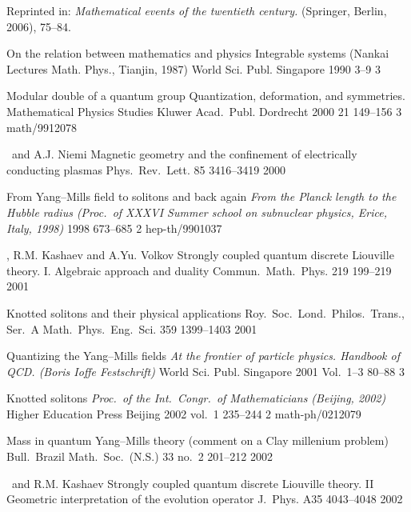 {
Reprinted in: {\em Mathematical events of the twentieth century.}
(Springer, Berlin, 2006), 75--84.

{\LF}
{On the relation between mathematics and physics} 
{Integrable systems (Nankai Lectures Math. Phys., Tianjin, 1987)}
{World Sci. Publ.} {Singapore} {1990} {} {3--9} {3} {}

{\LF} 
{Modular double of a quantum group} 
{Quantization, deformation, and symmetries. Mathematical Physics Studies} 
{Kluwer Acad.\ Publ.} {Dordrecht}
{2000} {21} {149--156} {3}
{math/9912078}

{\LF\ and A.J. Niemi}
{Magnetic geometry and the confinement of electrically conducting plasmas}
{Phys.\ Rev.\ Lett.} {85} {} {3416--3419} {2000}

{\LF}
{From Yang--Mills field to solitons and back again}
{\em From the Planck length to the Hubble radius
 (Proc.\ of XXXVI Summer school on subnuclear physics,
 Erice, Italy, 1998)} {} {} {1998} {} {673--685} {2}
{hep-th/9901037}

{\LF, R.M. Kashaev and A.Yu. Volkov}
{Strongly coupled quantum discrete {L}iouville theory. I.
  Algebraic approach and duality}
{Commun.\ Math.\ Phys.} {219} {} {199--219} {2001}

{\LF}
{Knotted solitons and their physical applications}
{Roy.\ Soc.\ Lond.\ Philos.\ Trans., Ser.\ A Math.\ Phys.\ Eng.\ Sci.} {359} {}
{1399--1403} {2001}

{\LF}
{Quantizing the Yang--Mills fields} 
{\em At the frontier of particle physics. Handbook of QCD.
(Boris Ioffe Festschrift)}
{World Sci. Publ.} {Singapore} {2001} {Vol.~1--3} {80--88} {3} {}

{\LF}
{Knotted solitons}
{\em Proc.\ of the Int.\ Congr.\ of Mathematicians (Beijing, 2002)}
{Higher Education Press} {Beijing} {2002} {vol.~1} {235--244} {2}
{math-ph/0212079}

{\LF}
{Mass in quantum Yang--Mills theory (comment on a Clay millenium
  problem)}
{Bull.\ Brazil Math.\ Soc.\ (N.S.)} {33} {no.~2} {201--212} {2002}
 
{\LF\ and R.M. Kashaev}
{Strongly coupled quantum discrete Liouville theory. II
  Geometric interpretation of the evolution operator}
{J.\ Phys.} {A35} {} {4043--4048} {2002}

}
